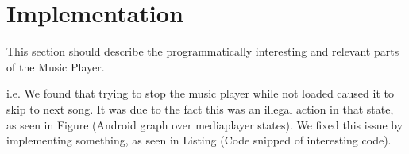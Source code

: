 \section{Implementation}
This section should describe the programmatically interesting and relevant parts of the Music Player.

i.e. We found that trying to stop the music player while not loaded caused it to skip to next song. It was due to the fact this was an illegal action in that state, as seen in Figure (Android graph over mediaplayer states). We fixed this issue by implementing something, as seen in Listing (Code snipped of interesting code).
